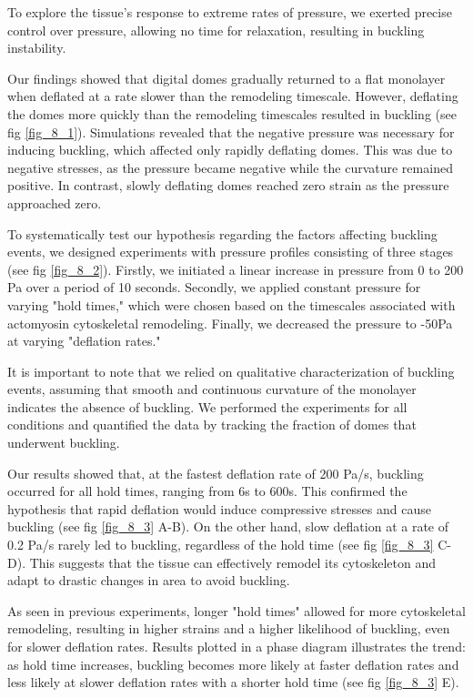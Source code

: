 To explore the tissue's response to extreme rates of pressure, we exerted precise control over pressure, allowing no time for relaxation, resulting in buckling instability.

Our findings showed that digital domes gradually returned to a flat monolayer when deflated at a rate slower than the remodeling timescale. However, deflating the domes more quickly than the remodeling timescales resulted in buckling  (see fig \ref{fig_8_1}). Simulations revealed that the negative pressure was necessary for inducing buckling, which affected only rapidly deflating domes. This was due to negative stresses, as the pressure became negative while the curvature remained positive. In contrast, slowly deflating domes reached zero strain as the pressure approached zero.

To systematically test our hypothesis regarding the factors affecting buckling events, we designed experiments with pressure profiles consisting of three stages (see fig \ref{fig_8_2}). Firstly, we initiated a linear increase in pressure from 0 to 200 Pa over a period of 10 seconds. Secondly, we applied constant pressure for varying "hold times," which were chosen based on the timescales associated with actomyosin cytoskeletal remodeling. Finally, we decreased the pressure to -50Pa at varying "deflation rates."

It is important to note that we relied on qualitative characterization of buckling events, assuming that smooth and continuous curvature of the monolayer indicates the absence of buckling. We performed the experiments for all conditions and quantified the data by tracking the fraction of domes that underwent buckling.

Our results showed that, at the fastest deflation rate of 200 Pa/s, buckling occurred for all hold times, ranging from 6s to 600s.  This confirmed the hypothesis that rapid deflation would induce compressive stresses and cause buckling (see fig \ref{fig_8_3} A-B). On the other hand, slow deflation at a rate of 0.2 Pa/s rarely led to buckling, regardless of the hold time (see fig \ref{fig_8_3} C-D). This suggests that the tissue can effectively remodel its cytoskeleton and adapt to drastic changes in area to avoid buckling.

As seen in previous experiments, longer "hold times" allowed for more cytoskeletal remodeling, resulting in higher strains and a higher likelihood of buckling, even for slower deflation rates. Results plotted in a phase diagram illustrates the trend: as hold time increases, buckling becomes more likely at faster deflation rates and less likely at slower deflation rates with a shorter hold time (see fig \ref{fig_8_3} E).


